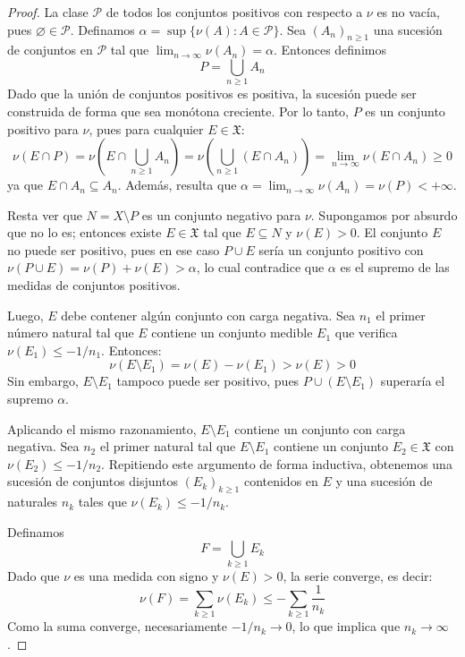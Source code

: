 \documentclass[12pt,a4paper]{article}
\theoremstyle{profesional}
\theoremstyle{definicion-style}
\newcommand{\X}{\mathfrak{X}}
\begin{document}
\begin{proof}
    La clase \(\mathcal{P}\) de todos los conjuntos positivos con respecto a \(\nu \) es no vacía, pues \(\varnothing \in \mathcal{P}\). Definamos
    \(\alpha = \sup \{ \nu(A) : A \in \mathcal{P} \} \). Sea \({(A_n)}_{n \geq 1}\) una sucesión de conjuntos en \(\mathcal{P}\) tal que
    \(\lim_{n \to \infty} \nu(A_n) = \alpha \). Entonces definimos
    \[
        P = \bigcup_{n \geq 1} A_n
    \]
    Dado que la unión de conjuntos positivos es positiva, la sucesión puede ser construida de forma que sea monótona creciente. Por lo tanto, \(P\) es un conjunto positivo para \(\nu \), pues para cualquier \(E \in \X \):
    \[
        \nu(E \cap P) = \nu \left( E \cap \bigcup_{n \geq 1} A_n \right) = \nu \left(\bigcup_{n \geq 1} (E \cap A_n) \right) = \lim_{n \to \infty} \nu(E \cap A_n) \geq 0
    \]
    ya que \(E \cap A_n \subseteq A_n\). Además, resulta que \(\alpha = \lim_{n \to \infty} \nu(A_n) = \nu(P) < +\infty \).

    Resta ver que \(N = X \setminus P\) es un conjunto negativo para \(\nu \). Supongamos por absurdo que no lo es; entonces existe \(E \in \X \) tal que \(E \subseteq N\) y \(\nu(E) > 0\). El conjunto \(E\) no puede ser positivo, pues en ese caso \(P \cup E\) sería un conjunto positivo con \(\nu(P \cup E) = \nu(P) + \nu(E) > \alpha \), lo cual contradice que \(\alpha \) es el supremo de las medidas de conjuntos positivos.

    Luego, \(E\) debe contener algún conjunto con carga negativa. Sea \(n_1\) el primer número natural tal que \(E\) contiene un conjunto medible \(E_1\) que verifica \(\nu(E_1) \leq -1/n_1\). Entonces:
    \[
        \nu(E \setminus E_1) = \nu(E) - \nu(E_1) > \nu(E) > 0
    \]
    Sin embargo, \(E \setminus E_1\) tampoco puede ser positivo, pues \(P \cup (E \setminus E_1)\) superaría el supremo \(\alpha \).

    Aplicando el mismo razonamiento, \(E \setminus E_1\) contiene un conjunto con carga negativa. Sea \(n_2\) el primer natural tal que \(E \setminus E_1\) contiene un conjunto \(E_2 \in \X \) con \(\nu(E_2) \leq -1/n_2\). Repitiendo este argumento de forma inductiva, obtenemos una sucesión de conjuntos disjuntos \({(E_k)}_{k \geq 1}\) contenidos en \(E\) y una sucesión de naturales \(n_k\) tales que \(\nu(E_k) \leq -1/n_k\).

    Definamos
    \[
        F = \bigcup_{k \geq 1} E_k
    \]
    Dado que \(\nu \) es una medida con signo y \(\nu(E) > 0\), la serie converge, es decir:
    \[
        \nu(F) = \sum_{k \geq 1} \nu(E_k) \leq - \sum_{k \geq 1} \frac{1}{n_k}
    \]
    Como la suma converge, necesariamente \(-1/n_k \to 0\), lo que implica que \(n_k \to \infty \).


\end{proof}
\end{document}
